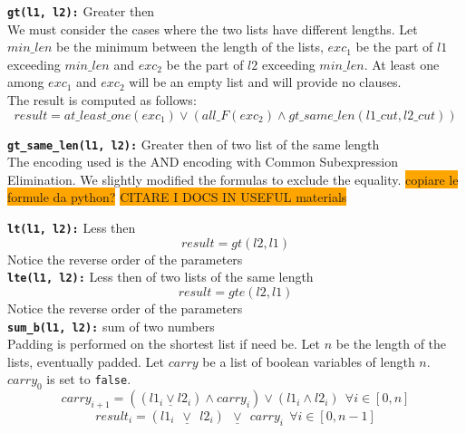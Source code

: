 \texttt{\textbf{gt(l1, l2):}} Greater then\\
We must consider the cases where the two lists have different lengths.
Let $min\_len$ be the minimum between the length of the lists, $exc_1$ be the part of $l1$ 
exceeding $min\_len$ and $exc_2$ 
be the part of $l2$ exceeding $min\_len$. At least one among $exc_1$ and $exc_2$ will be an
empty list and will provide no clauses.\\
The result is computed as follows:
\begin{equation}
    result = at\_least\_one(exc_1) \vee ( all\_F(exc_2) \wedge gt\_same\_len(l1\_cut, l2\_cut))
\end{equation}

\texttt{\textbf{gt\_same\_len(l1, l2):}} Greater then of two list of the same length\\
The encoding used is the AND encoding with Common Subexpression Elimination. We slightly
modified the formulas to exclude the equality.
\colorbox{orange}{copiare le formule da python?}
\colorbox{orange}{CITARE I DOCS IN USEFUL materials}

\texttt{\textbf{lt(l1, l2):}} Less then\\
\begin{equation}
    result = gt(l2, l1)
\end{equation}
Notice the reverse order of the parameters\\

\texttt{\textbf{lte(l1, l2):}} Less then of two lists of the same length\\
\begin{equation}
    result = gte(l2, l1)
\end{equation}
Notice the reverse order of the parameters\\

\texttt{\textbf{sum\_b(l1, l2):}} sum of two numbers\\
Padding is performed on the shortest list if need be.
Let $n$ be the length of the lists, eventually padded. Let $carry$ be a list of boolean
variables of length $n$. $carry_0$ is set to \texttt{false}.  
\begin{equation}
    carry_{i+1} = ((l1_i \underline\vee l2_i) \wedge carry_i) \vee (l1_i \wedge l2_i)  \  \ \forall i \in [0, n]
\end{equation}
\begin{equation}
        result_i = (l1_i \ \ \underline\vee \ \ l2_i) \ \ \underline\vee \ \ carry_i \  \ \forall i \in [0, n-1]
\end{equation}

